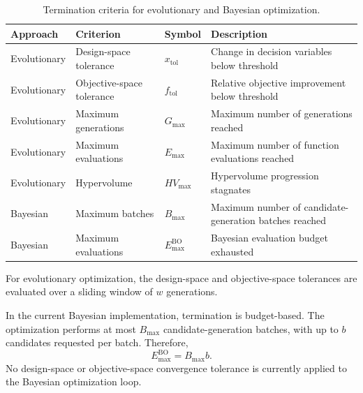 \begin{table}[htbp]
\centering
\caption{Termination criteria for evolutionary and Bayesian optimization.}
\label{tab:termination_sc}
\begin{tabularx}{\textwidth}{@{}l l l >{\raggedright\arraybackslash}X@{}}
\toprule
\textbf{Approach} & \textbf{Criterion} & \textbf{Symbol} & \textbf{Description} \\
\midrule
Evolutionary & Design-space tolerance & $x_{\text{tol}}$ & Change in decision variables below
threshold \\

Evolutionary & Objective-space tolerance & $f_{\text{tol}}$ & Relative objective improvement below
threshold \\

Evolutionary & Maximum generations & $G_{\max}$ & Maximum number of generations reached \\

Evolutionary & Maximum evaluations & $E_{\max}$ & Maximum number of function evaluations reached \\

Evolutionary & Hypervolume & $HV_{\max}$ & Hypervolume progression stagnates  \\

Bayesian & Maximum batches & $B_{\max}$ & Maximum number of candidate-generation batches reached \\

Bayesian & Maximum evaluations & $E_{\max}^{\mathrm{BO}}$ & Bayesian evaluation budget exhausted \\
\bottomrule
\end{tabularx}
\end{table}

For evolutionary optimization, the design-space and objective-space tolerances are evaluated over a
sliding window of $w$ generations.  

In the current Bayesian implementation, termination is budget-based. The optimization performs at
most $B_{\max}$ candidate-generation batches, with up to $b$ candidates requested per batch.
Therefore,
\begin{equation}
    E_{\max}^{\mathrm{BO}} = B_{\max}b.
\end{equation}
No design-space or objective-space convergence tolerance is currently applied to the Bayesian
optimization loop.

